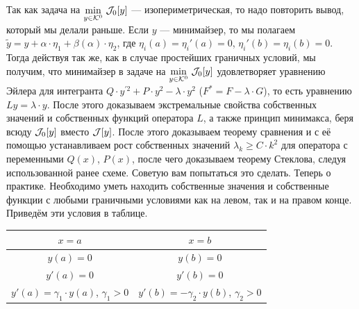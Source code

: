Так как задача на $\displaystyle\min\limits_{y\in\mathcal{K}^0}\,\mathcal{J}_0[y]$ --- изопериметрическая, то надо повторить вывод, который мы делали раньше. Если $y$ --- минимайзер, то мы полагаем $\tilde{y}=y+\alpha\cdot\eta_1+\beta(\alpha)\cdot\eta_2$, где $\eta_i(a)=\eta_i'(a)=0$, $\eta_i'(b)=\eta_i(b)=0$. Тогда действуя так же, как в случае простейших граничных условий, мы получим, что минимайзер в задаче на $\displaystyle\min\limits_{y\in\mathcal{K}^0}\,\mathcal{J}_0[y]$ удовлетворяет уравнению Эйлера для интегранта $Q\cdot y^{\prime2}+P\cdot y^2-\lambda\cdot y^2$ ($F^{\ast}=F-\lambda\cdot G$), то есть уравнению $Ly=\lambda\cdot y$. После этого доказываем экстремальные свойства собственных значений и собственных функций оператора $L$, а также принцип минимакса, беря всюду $\mathcal{J}_0[y]$ вместо $\mathcal{J}[y]$. После этого доказываем теорему сравнения и с её помощью устанавливаем рост собственных значений $\lambda_k\geqslant C\cdot k^2$ для оператора с переменными $Q(x)$, $P(x)$, после чего доказываем теорему Стеклова, следуя использованной ранее схеме. Советую вам попытаться это сделать. Теперь о практике. Необходимо уметь находить собственные значения и собственные функции с любыми граничными условиями как на левом, так и на правом конце. Приведём эти условия в таблице.
\begin{center}
	\begin{tabular}{|c|c|}
		\hline
		$x=a$ & $x=b$ \\
		\hline
		$y(a)=0$ & $y(b)=0$ \\
		\hline
		$y'(a)=0$ & $y'(b)=0$ \\
		\hline
		$y'(a)=\gamma_1\cdot y(a)$, $\gamma_1>0$ & $y'(b)=-\gamma_2\cdot y(b)$, $\gamma_2>0$ \\
		\hline
	\end{tabular} 
\end{center}